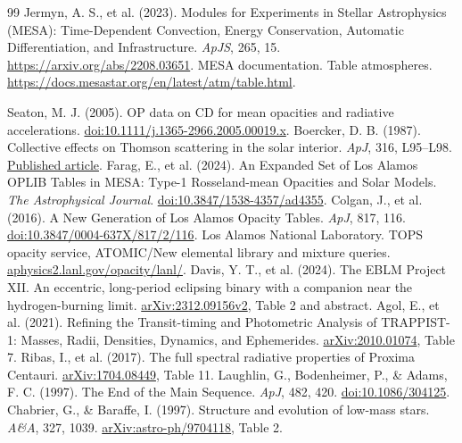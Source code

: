 \documentclass[11pt,letterpaper]{article}
\begin{document}
\begin{thebibliography}{99}\small
{} Jermyn, A. S., et al. (2023).
Modules for Experiments in Stellar Astrophysics (MESA): Time-Dependent
Convection, Energy Conservation, Automatic Differentiation, and Infrastructure.
\emph{ApJS}, 265, 15. \url{https://arxiv.org/abs/2208.03651}.
 MESA documentation. Table atmospheres.
\url{https://docs.mesastar.org/en/latest/atm/table.html}.

 Seaton, M. J. (2005).
OP data on CD for mean opacities and radiative accelerations.
\href{https://doi.org/10.1111/j.1365-2966.2005.00019.x}{doi:10.1111/j.1365-2966.2005.00019.x}.
 Boercker, D. B. (1987).
Collective effects on Thomson scattering in the solar interior.
\emph{ApJ}, 316, L95--L98.
\href{https://articles.adsabs.harvard.edu/pdf/1987ApJ...316L..95B}{Published article}.
 Farag, E., et al. (2024).
An Expanded Set of Los Alamos OPLIB Tables in MESA:
Type-1 Rosseland-mean Opacities and Solar Models.
\textit{The Astrophysical Journal}.
\href{https://doi.org/10.3847/1538-4357/ad4355}{doi:10.3847/1538-4357/ad4355}.
 Colgan, J., et al. (2016).
A New Generation of Los Alamos Opacity Tables. \textit{ApJ}, 817, 116.
\href{https://doi.org/10.3847/0004-637X/817/2/116}{doi:10.3847/0004-637X/817/2/116}.
 Los Alamos National Laboratory. TOPS opacity service,
ATOMIC/New elemental library and mixture queries.
\href{https://aphysics2.lanl.gov/opacity/lanl/}{aphysics2.lanl.gov/opacity/lanl/}.
 Davis, Y. T., et al. (2024).
The EBLM Project XII. An eccentric, long-period eclipsing binary with a companion
near the hydrogen-burning limit.
\href{https://arxiv.org/pdf/2312.09156v2}{arXiv:2312.09156v2}, Table 2 and abstract.
 Agol, E., et al. (2021).
Refining the Transit-timing and Photometric Analysis of TRAPPIST-1:
Masses, Radii, Densities, Dynamics, and Ephemerides.
\href{https://arxiv.org/pdf/2010.01074}{arXiv:2010.01074}, Table 7.
 Ribas, I., et al. (2017).
The full spectral radiative properties of Proxima Centauri.
\href{https://arxiv.org/pdf/1704.08449}{arXiv:1704.08449}, Table 11.
 Laughlin, G., Bodenheimer, P., \& Adams, F. C. (1997).
The End of the Main Sequence. \emph{ApJ}, 482, 420.
\href{https://doi.org/10.1086/304125}{doi:10.1086/304125}.
 Chabrier, G., \& Baraffe, I. (1997).
Structure and evolution of low-mass stars. \emph{A\&A}, 327, 1039.
\href{https://arxiv.org/abs/astro-ph/9704118}{arXiv:astro-ph/9704118}, Table 2.

\end{thebibliography}
\end{document}

